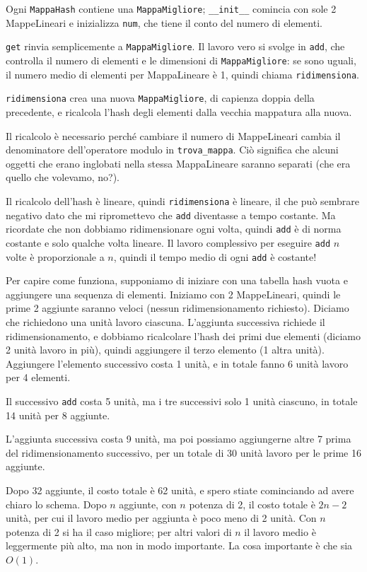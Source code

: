 \documentclass[10pt]{book}
\begin{document}
Ogni {\tt MappaHash} contiene una {\tt MappaMigliore}; \verb"__init__" comincia con sole 2 MappeLineari e inizializza {\tt num}, che tiene il conto del numero di elementi.

{\tt get} rinvia semplicemente a {\tt MappaMigliore}.  Il lavoro vero si svolge in {\tt add}, che controlla il numero di elementi e le dimensioni di
{\tt MappaMigliore}: se sono uguali, il numero medio di elementi per MappaLineare è 1, quindi chiama {\tt ridimensiona}.

{\tt ridimensiona} crea una nuova {\tt MappaMigliore}, di capienza doppia della precedente, e ricalcola l'hash degli elementi dalla vecchia mappatura alla nuova.

Il ricalcolo è necessario perché cambiare il numero di MappeLineari cambia il denominatore dell'operatore modulo in \verb"trova_mappa".  Ciò significa che alcuni oggetti che erano inglobati nella stessa MappaLineare saranno separati (che era quello che volevamo, no?).

Il ricalcolo dell'hash è lineare, quindi {\tt ridimensiona} è lineare, il che può sembrare negativo dato che mi ripromettevo che {\tt add} diventasse a tempo costante.  Ma ricordate che non dobbiamo ridimensionare ogni volta, quindi {\tt add} è di norma costante e solo qualche volta lineare. Il lavoro complessivo per eseguire {\tt add} $n$ volte è proporzionale a $n$, quindi il tempo medio di ogni {\tt add} è costante!

Per capire come funziona, supponiamo di iniziare con una tabella hash vuota e aggiungere una sequenza di elementi. Iniziamo con 2 MappeLineari, quindi le prime 2 aggiunte saranno veloci (nessun ridimensionamento richiesto). Diciamo che richiedono una unità lavoro ciascuna. L'aggiunta successiva richiede il ridimensionamento, e dobbiamo ricalcolare l'hash dei primi due elementi (diciamo 2 unità lavoro in più), quindi aggiungere il terzo elemento (1 altra unità). Aggiungere l'elemento successivo costa 1 unità, e in totale fanno 6 unità lavoro per 4 elementi.

Il successivo {\tt add} costa 5 unità, ma i tre successivi solo 1 unità ciascuno, in totale 14 unità per 8 aggiunte.

L'aggiunta successiva costa 9 unità, ma poi possiamo aggiungerne altre 7 prima del ridimensionamento successivo, per un totale di 30 unità lavoro per le prime 16 aggiunte.

Dopo 32 aggiunte, il costo totale è 62 unità, e spero stiate cominciando ad avere chiaro lo schema. Dopo $n$ aggiunte, con $n$ potenza di 2, il costo totale è $2n-2$ unità, per cui il lavoro medio per aggiunta è poco meno di 2 unità. Con $n$ potenza di 2 si ha il caso migliore; per altri valori di $n$ il lavoro medio è leggermente più alto, ma non in modo importante. La cosa importante è che sia
$O(1)$.
\end{document}
